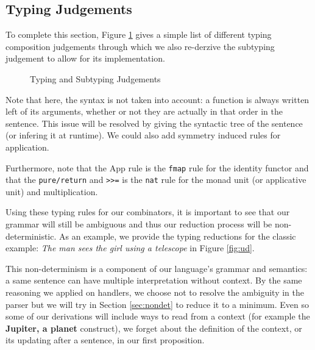 \subsection{Typing Judgements}\label{subsec:judgements}
To complete this section, Figure \ref{tab:judgements} gives a simple list of different typing composition judgements through which we also re-derzive the subtyping judgement to allow for its implementation.
\begin{figure}
	
	\caption{Typing and Subtyping Judgements}
	\label{tab:judgements}
\end{figure}
Note that here, the syntax is not taken into account: a function is always written left of its arguments, whether or not they are actually in that order in the sentence.
This issue will be resolved by giving the syntactic tree of the sentence (or infering it at runtime).
We could also add symmetry induced rules for application.

Furthermore, note that the App rule is the \texttt{fmap} rule for the identity functor and that the \texttt{pure/return} and \texttt{>>=} is the \texttt{nat} rule for the monad unit (or applicative unit) and multiplication.

\medskip

Using these typing rules for our combinators, it is important to see that our grammar will still be ambiguous and thus our reduction process will be non-deterministic.
As an example, we provide the typing reductions for the classic example: \textsl{The man sees the girl using a telescope} in Figure \ref{fig:ud}.

\begin{figure*}
	\centering
	\caption{Parsing trees for the typing of \textsl{The man sees the girl using a telescope}.}
	\label{fig:ud}
\end{figure*}

This non-determinism is a component of our language's grammar and semantics: a same sentence can have multiple interpretation without context.
By the same reasoning we applied on handlers, we choose not to resolve the ambiguity in the parser but we will try in Section \ref{sec:nondet} to reduce it to a minimum.
Even so some of our derivations will include ways to read from a context (for example the \textbf{Jupiter, a planet} construct), we forget about the definition of the context, or its updating after a sentence, in our first proposition.

